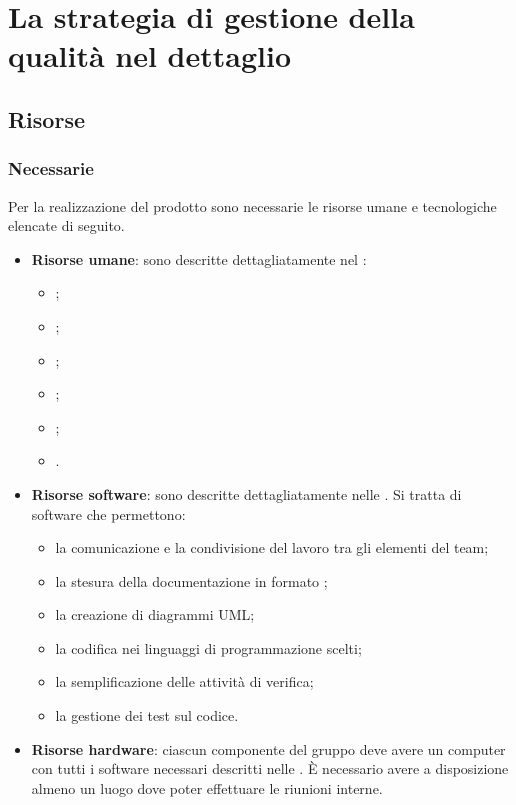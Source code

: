 \documentclass[../PianoDiQualifica.tex]{subfiles}
\begin{document}
	\section{La strategia di gestione della qualità nel dettaglio}
		\subsection{Risorse}
			\subsubsection{Necessarie}
				Per la realizzazione del prodotto sono necessarie le risorse
				umane e tecnologiche elencate di seguito.
				\begin{itemize}
					\item \textbf{Risorse umane}: sono descritte
					dettagliatamente nel \pianodiprogettov:
					\begin{itemize}
						\item \responsabilediprogetto;
						\item \amministratore;
						\item \analista;
						\item \progettista;
						\item \programmatore;
						\item \verificatore.
					\end{itemize}
					\item \textbf{Risorse software}: sono descritte
					dettagliatamente nelle \normediprogettov. Si tratta di
					software che permettono:
					\begin{itemize}
						\item la comunicazione e la condivisione del lavoro
						tra gli elementi del team;
						\item la stesura della documentazione in
						formato \gl{\LaTeX};
						\item la creazione di diagrammi UML;
						\item la codifica nei linguaggi di programmazione scelti;
						\item la semplificazione delle attività di verifica;
						\item la gestione dei test sul codice.
					\end{itemize}
					\item \textbf{Risorse hardware}: ciascun componente del
					gruppo deve avere un computer con tutti i software necessari
					descritti nelle \normediprogettov. È necessario avere a
					disposizione almeno un luogo dove poter effettuare le
					riunioni interne.
				\end{itemize}
\end{document}
